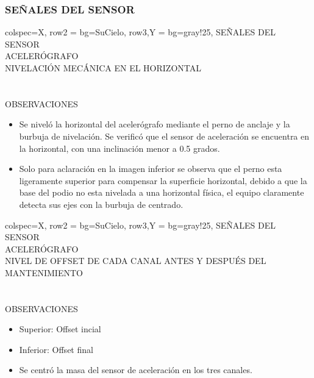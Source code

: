 \subsubsection{SEÑALES DEL SENSOR}
\begin{tblr}{
        colspec={X},
        row{2} = {bg=SuCielo},
        row{3,Y} = {bg=gray!25},
    } %
    SEÑALES DEL SENSOR \\
    ACELERÓGRAFO \MakeUppercase{} \\
    NIVELACIÓN MECÁNICA EN EL HORIZONTAL \\
      \\
     \\
    OBSERVACIONES \\
    \begin{itemize}
        \item Se niveló la horizontal del acelerógrafo mediante el perno de anclaje y la burbuja de nivelación. Se verificó que el sensor de aceleración se encuentra en la horizontal, con una inclinación menor a 0.5 grados.
        \item Solo para aclaración en la imagen inferior se observa que el perno esta ligeramente superior para compensar la superficie horizontal, debido a que la base del podio no esta nivelada a una horizontal física, el equipo claramente detecta sus ejes con la burbuja de centrado.
    \end{itemize}
\end{tblr}
% 
\newpage
\begin{tblr}{
        colspec={X},
        row{2} = {bg=SuCielo},
        row{3,Y} = {bg=gray!25},
    } %
    SEÑALES DEL SENSOR \\
    ACELERÓGRAFO \MakeUppercase{} \\
    NIVEL DE OFFSET DE CADA CANAL ANTES Y DESPUÉS DEL MANTENIMIENTO \\
     \\
     \\
    OBSERVACIONES \\
    \begin{itemize}
        \item Superior: Offset incial
        \item Inferior: Offset final
        \item Se centró la masa del sensor de aceleración en los tres canales.
    \end{itemize}
\end{tblr}
